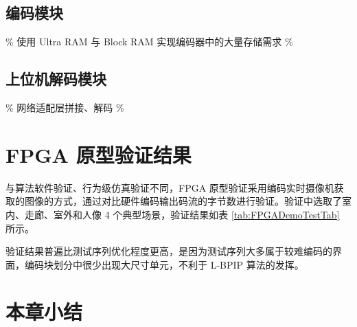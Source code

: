 \subsection{编码模块}
\% 使用 Ultra RAM 与 Block RAM 实现编码器中的大量存储需求 \%

\subsection{上位机解码模块}
\% 网络适配层拼接、解码 \%

\section{FPGA 原型验证结果}
与算法软件验证、行为级仿真验证不同，FPGA 原型验证采用编码实时摄像机获取的图像的方式，通过对比硬件编码输出码流的字节数进行验证。验证中选取了室内、走廊、室外和人像 4 个典型场景，验证结果如表 \ref{tab:FPGADemoTestTab} 所示。


验证结果普遍比测试序列优化程度更高，是因为测试序列大多属于较难编码的界面，编码块划分中很少出现大尺寸单元，不利于 L-BPIP 算法的发挥。

\section{本章小结}